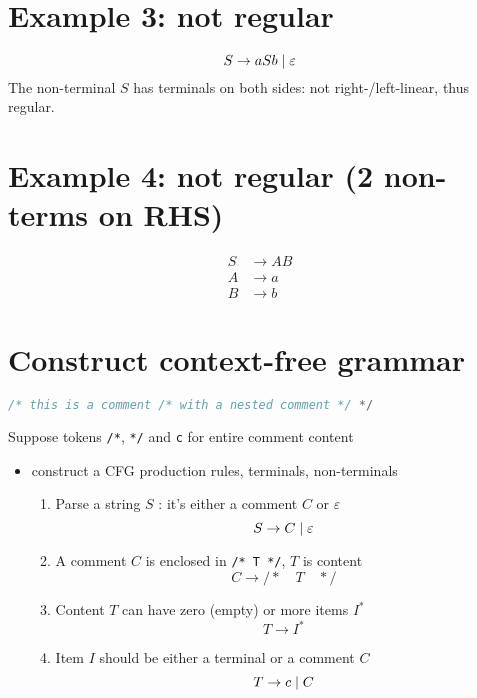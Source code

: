 \documentclass[10pt,a4paper,landscape]{article}
\begin{document}
\begin{multicols*}{3}
\begin{minipage}{.5\linewidth}
\section*{Example 3: not regular}
\[
  S\to aSb\;|\; \varepsilon
\]
The non-terminal $S$ has terminals on both sides: not right-/left-linear, thus  regular.
\end{minipage}
\begin{minipage}{.5\linewidth}
\section*{Example 4: not regular (2 non-terms on RHS)}
\begin{align*}
  S&\to AB \\
  A&\to a\\
  B&\to b
\end{align*}
\end{minipage}
\section*{Construct context-free grammar}
\begin{lstlisting}[language=c]
  /* this is a comment /* with a nested comment */ */
\end{lstlisting}
Suppose tokens \texttt{/*}, \texttt{*/} and \texttt{c} for entire comment content
\begin{itemize}
\item construct a CFG production rules, terminals, non-terminals
  \begin{enumerate}
  \item Parse a string $S$ : it's either a comment $C$ or $\varepsilon$
    \begin{equation}
      S\to C \;|\; \varepsilon
    \end{equation}
  \item A comment $C$ is enclosed in \texttt{/* T */}, $T$ is content
    \begin{equation}
      C\to /*\quad T\quad */
    \end{equation}
  \item Content $T$ can have zero (empty) or more items $I^*$
    \begin{equation}
      T\to I^*
    \end{equation}
  \item Item $I$ should be either a terminal or a comment $C$
    \begin{equation}
      T\to c \;|\; C
    \end{equation}
  \end{enumerate}

\end{itemize}
\end{multicols*}
\end{document}
